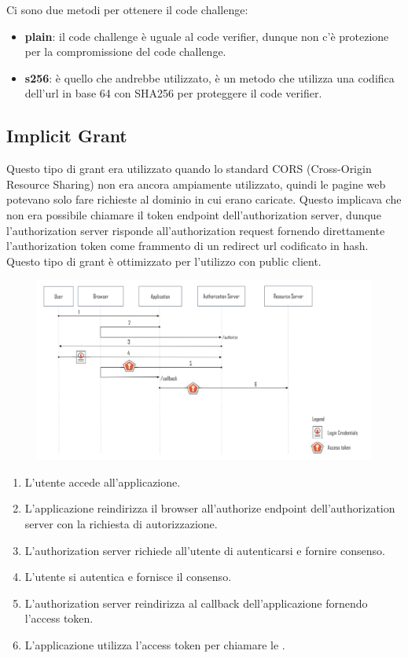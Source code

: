 Ci sono due metodi per ottenere il code challenge:

\begin{itemize}
      \item \textbf{plain}: il code challenge è uguale al code verifier, dunque non c'è
            protezione per la compromissione del code challenge.
      \item \textbf{s256}: è quello che andrebbe utilizzato, è un metodo che utilizza
            una codifica dell'url in base 64 con SHA256 per proteggere il code verifier.
\end{itemize}

\subsection{Implicit Grant}

Questo tipo di grant era utilizzato quando lo standard CORS (Cross-Origin Resource
Sharing) non era ancora ampiamente utilizzato, quindi le pagine web potevano solo
fare richieste al dominio in cui erano caricate. Questo implicava che non era possibile
chiamare il token endpoint dell'authorization server, dunque l'authorization server
risponde all'authorization request fornendo direttamente l'authorization token come
frammento di un redirect url codificato in hash.
Questo tipo di grant è ottimizzato per l'utilizzo con public client.

\begin{figure}[H]
      \centering
      \includegraphics[width=\textwidth, keepaspectratio]{capitoli/id_managing/imgs/implicitgrant.png}
\end{figure}

\begin{enumerate}
      \item L'utente accede all'applicazione.
      \item L'applicazione reindirizza il browser all'authorize endpoint
            dell'authorization server con la richiesta di autorizzazione.
      \item L'authorization server richiede all'utente di autenticarsi e fornire consenso.
      \item L'utente si autentica e fornisce il consenso.
      \item L'authorization server reindirizza al callback dell'applicazione fornendo
            l'access token.
      \item L'applicazione utilizza l'access token per chiamare le \api{}.
\end{enumerate}

